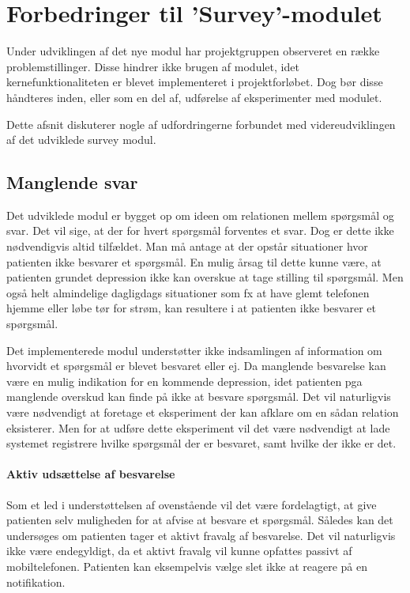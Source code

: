 
\section{Forbedringer til 'Survey'-modulet}
Under udviklingen af det nye modul har projektgruppen observeret en række problemstillinger.
Disse hindrer ikke brugen af modulet, idet kernefunktionaliteten er blevet implementeret i projektforløbet.
Dog bør disse håndteres inden, eller som en del af, udførelse af eksperimenter med modulet.

Dette afsnit diskuterer nogle af udfordringerne forbundet med videreudviklingen af det udviklede survey modul.

\subsection{Manglende svar}
Det udviklede modul er bygget op om ideen om relationen mellem spørgsmål og svar.
Det vil sige, at der for hvert spørgsmål forventes et svar.
Dog er dette ikke nødvendigvis altid tilfældet.
Man må antage at der opstår situationer hvor patienten ikke besvarer et spørgsmål.
En mulig årsag til dette kunne være, at patienten grundet depression ikke kan overskue at tage stilling til spørgsmål.
Men også helt almindelige dagligdags situationer som fx at have glemt telefonen hjemme eller løbe tør for strøm, kan resultere i at patienten ikke besvarer et spørgsmål.

Det implementerede modul understøtter ikke indsamlingen af information om hvorvidt et spørgsmål er blevet besvaret eller ej.
Da manglende besvarelse kan være en mulig indikation for en kommende depression, idet patienten pga manglende overskud kan finde på ikke at besvare spørgsmål.
Det vil naturligvis være nødvendigt at foretage et eksperiment der kan afklare om en sådan relation eksisterer.
Men for at udføre dette eksperiment vil det være nødvendigt at lade systemet registrere hvilke spørgsmål der er besvaret, samt hvilke der ikke er det.

\paragraph{Aktiv udsættelse af besvarelse}
Som et led i understøttelsen af ovenstående vil det være fordelagtigt, at give patienten selv muligheden for at afvise at besvare et spørgsmål.
Således kan det undersøges om patienten tager et aktivt fravalg af besvarelse.
Det vil naturligvis ikke være endegyldigt, da et aktivt fravalg vil kunne opfattes passivt af mobiltelefonen.
Patienten kan eksempelvis vælge slet ikke at reagere på en notifikation.

